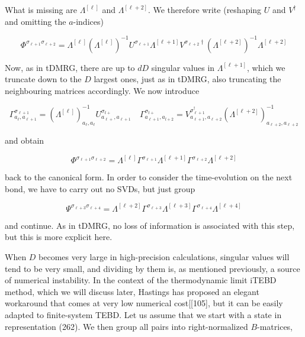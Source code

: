 \documentclass[12pt]{article}
\begin{document}
What is missing are $\Lambda^{[\ell]}$ and $\Lambda^{[\ell+2]}$. We therefore write (reshaping $U$ and $V^{\dagger}$ and omitting the $a$-indices)


\begin{equation*}
\Phi^{\sigma_{\ell+1} \sigma_{\ell+2}}=\Lambda^{[\ell]}\left(\Lambda^{[\ell]}\right)^{-1} U^{\sigma_{\ell+1}} \Lambda^{[\ell+1]} V^{\sigma_{\ell+2} \dagger}\left(\Lambda^{[\ell+2]}\right)^{-1} \Lambda^{[\ell+2]} \tag{266}
\end{equation*}


Now, as in tDMRG, there are up to $d D$ singular values in $\Lambda^{[\ell+1]}$, which we truncate down to the $D$ largest ones, just as in tDMRG, also truncating the neighbouring matrices accordingly. We now introduce


\begin{equation*}
\Gamma_{a_{\ell}, a_{\ell+1}}^{\sigma_{\ell+1}}=\left(\Lambda^{[\ell]}\right)_{a_{\ell}, a_{\ell}}^{-1} U_{a_{\ell+}, a_{\ell+1}}^{\sigma_{t+}} \quad \Gamma_{a_{\ell+1}, a_{l+2}}^{\sigma_{t+}}=V_{a_{\ell+1}, a_{\ell+2}}^{\sigma_{\ell+1}^{\dagger}}\left(\Lambda^{[\ell+2]}\right)_{a_{\ell+2}, a_{\ell+2}}^{-1} \tag{267}
\end{equation*}


and obtain


\begin{equation*}
\Phi^{\sigma_{\ell+1} \sigma_{\ell+2}}=\Lambda^{[\ell]} \Gamma^{\sigma_{\ell+1}} \Lambda^{[\ell+1]} \Gamma^{\sigma_{\ell+2}} \Lambda^{[\ell+2]} \tag{268}
\end{equation*}


back to the canonical form. In order to consider the time-evolution on the next bond, we have to carry out no SVDs, but just group


\begin{equation*}
\Psi^{\sigma_{\ell+3} \sigma_{\ell+4}}=\Lambda^{[\ell+2]} \Gamma^{\sigma_{\ell+3}} \Lambda^{[\ell+3]} \Gamma^{\sigma_{\ell+4}} \Lambda^{[\ell+4]} \tag{269}
\end{equation*}


and continue. As in tDMRG, no loss of information is associated with this step, but this is more explicit here.

When $D$ becomes very large in high-precision calculations, singular values will tend to be very small, and dividing by them is, as mentioned previously, a source of numerical instability. In the context of the thermodynamic limit iTEBD method, which we will discuss later, Hastings has proposed an elegant workaround that comes at very low numerical cost[[105], but it can be easily adapted to finite-system TEBD. Let us assume that we start with a state in representation (262). We then group all pairs into right-normalized $B$-matrices,
\end{document}
